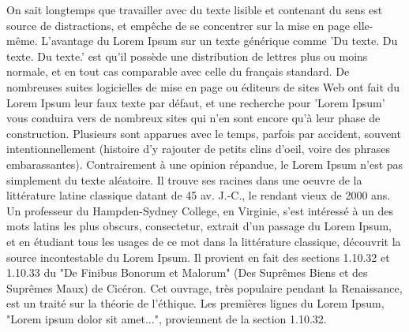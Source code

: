 \documentclass{article}
\begin{document}
\beginnumbering
\pstart
On sait  longtemps que travailler avec du texte lisible et contenant du sens est source de distractions, et empêche de se concentrer sur la mise en page elle-même. L'avantage du Lorem Ipsum sur un texte générique comme 'Du texte. Du texte. Du texte.' est qu'il possède une distribution de lettres plus ou moins normale, et en tout cas comparable avec celle du français standard. De nombreuses suites logicielles de mise en page ou éditeurs de sites Web ont fait du Lorem Ipsum leur faux texte par défaut, et une recherche pour 'Lorem Ipsum' vous conduira vers de nombreux sites qui n'en sont encore qu'à leur phase de construction. Plusieurs  sont apparues avec le temps, parfois par accident, souvent intentionnellement (histoire d'y rajouter de petits clins d'oeil, voire des phrases embarassantes).
\pend
\pstart
Contrairement à une opinion répandue, le Lorem Ipsum n'est pas simplement du texte aléatoire. Il trouve ses racines dans une oeuvre de la littérature latine classique datant de 45 av. J.-C., le rendant vieux de 2000 ans. Un professeur du Hampden-Sydney College, en Virginie, s'est intéressé à un des mots latins les plus obscurs, consectetur, extrait d'un passage du Lorem Ipsum, et en étudiant tous les usages de ce mot dans la littérature classique, découvrit la source incontestable du Lorem Ipsum. Il provient en fait des sections 1.10.32 et 1.10.33 du "De Finibus Bonorum et Malorum" (Des Suprêmes Biens et des Suprêmes Maux) de Cicéron. Cet ouvrage, très populaire pendant la Renaissance, est un traité sur la théorie de l'éthique. Les premières lignes du Lorem Ipsum, "Lorem ipsum dolor sit amet...", proviennent de la section 1.10.32.
\pend
\endnumbering
\end{document}
